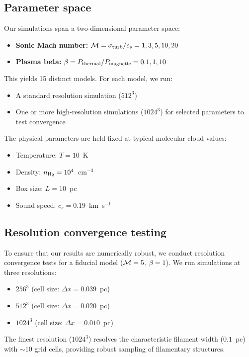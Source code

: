 \documentclass{mnras}
\begin{document}
\subsection{Parameter space}

Our simulations span a two-dimensional parameter space:

\begin{itemize}
\item \textbf{Sonic Mach number:} ${\cal M} = \sigma_{\rm turb} / c_s = 1, 3, 5, 10, 20$
\item \textbf{Plasma beta:} $\beta = P_{\rm thermal} / P_{\rm magnetic} = 0.1, 1, 10$
\end{itemize}

This yields 15 distinct models. For each model, we run:
\begin{itemize}
\item A standard resolution simulation ($512^3$)
\item One or more high-resolution simulations ($1024^3$) for selected parameters to test convergence
\end{itemize}

The physical parameters are held fixed at typical molecular cloud values:
\begin{itemize}
\item Temperature: $T = 10$~K
\item Density: $n_{\rm H_2} = 10^4$~cm$^{-3}$
\item Box size: $L = 10$~pc
\item Sound speed: $c_s = 0.19$~km~s$^{-1}$
\end{itemize}

\subsection{Resolution convergence testing}

To ensure that our results are numerically robust, we conduct resolution convergence tests for a fiducial model (${\cal M} = 5$, $\beta = 1$). We run simulations at three resolutions:
\begin{itemize}
\item $256^3$ (cell size: $\Delta x = 0.039$~pc)
\item $512^3$ (cell size: $\Delta x = 0.020$~pc)
\item $1024^3$ (cell size: $\Delta x = 0.010$~pc)
\end{itemize}

The finest resolution ($1024^3$) resolves the characteristic filament width ($0.1$~pc) with $\sim 10$ grid cells, providing robust sampling of filamentary structures.
\end{document}
